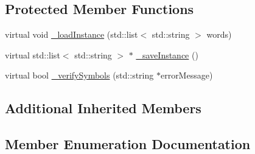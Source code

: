 \subsection*{Protected Member Functions}
\begin{DoxyCompactItemize}
\item 
virtual void \hyperlink{class_queue_ac722922c7cac47ed74502c2d7206c074}{\+\_\+load\+Instance} (std\+::list$<$ std\+::string $>$ words)
\item 
virtual std\+::list$<$ std\+::string $>$ $\ast$ \hyperlink{class_queue_a9245790264a9d68030ae8bd884c85bcf}{\+\_\+save\+Instance} ()
\item 
virtual bool \hyperlink{class_queue_a81f6676597a7974af394ddd3f67c7926}{\+\_\+verify\+Symbols} (std\+::string $\ast$error\+Message)
\end{DoxyCompactItemize}
\subsection*{Additional Inherited Members}


\subsection{Member Enumeration Documentation}
